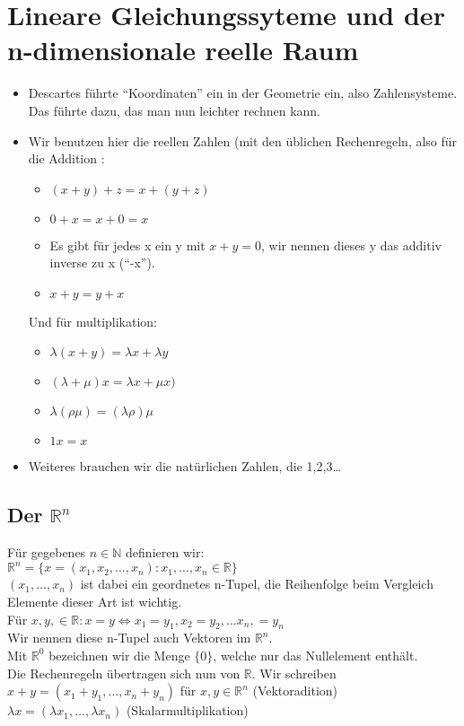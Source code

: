 \documentclass{scrartcl}
\newcommand{\lb}{\lambda}
\newcommand{\R}{\mathbb{R}}
\newcommand{\N}{\mathbb{N}}
\newcommand{\mR}{\(\mathbb{R}\)}
\newcommand{\Rn}{\mathbb{R}^n}
\newcommand{\mRn}{\(\mathbb{R}^n\)}
\begin{document}
\section{Lineare Gleichungssyteme und der n-dimensionale reelle Raum}
\begin{itemize}
\item{Descartes f\"uhrte ``Koordinaten'' ein in der Geometrie ein, also Zahlensysteme. Das f\"uhrte dazu, das man nun leichter rechnen kann.}
\item{Wir benutzen hier die reellen Zahlen (mit den \"ublichen Rechenregeln, also f\"ur die Addition :
\begin{itemize}
\item{\((x + y) + z = x + (y + z)\)}\\
\item{\(0 + x = x + 0 = x\)}
\item{Es gibt f\"ur jedes x ein y mit \(x + y = 0\), wir nennen dieses y das additiv inverse zu x (``-x'').}
\item{\(x + y = y + x\)}
\end{itemize}
Und f\"ur multiplikation:
\begin{itemize}
\item{\(\lambda (x + y) = \lambda x + \lambda y\)}
\item{\((\lambda + \mu) x = \lambda x + \mu x)\)}
\item{\(\lb(\rho\mu)=(\lb\rho)\mu\)}
\item{\(1x = x\)}
\end{itemize}
}
\item{Weiteres brauchen wir die nat\"urlichen Zahlen, die 1,2,3\dots}
\end{itemize}

\subsection{Der \(\R^n\)}
F\"ur gegebenes \(n \in \N\) definieren wir:\\
\(\R^n = \{x = (x_1, x_2, \dots, x_n): x_1, \dots, x_n \in \R\}\)\\
\((x_1, \dots, x_n)\) ist dabei ein geordnetes n-Tupel, die Reihenfolge beim Vergleich Elemente dieser Art ist wichtig.\\
F\"ur \(x, y, \in \R : x = y \Leftrightarrow x_1 = y_1, x_2 = y_2, \dots x_n, = y_n\)\\
Wir nennen diese n-Tupel auch Vektoren im \mRn.\\
Mit \(\R^0\) bezeichnen wir die Menge \(\{0\}\), welche nur das Nullelement enth\"alt.\\
Die Rechenregeln \"ubertragen sich nun von \mR. Wir schreiben\\
\(x + y = (x_1 + y_1, \dots, x_n + y_n)\) f\"ur \(x, y \in \Rn\) (Vektoradition)\\
\(\lb x = (\lb x_1, \dots, \lb x_n)\) (Skalarmultiplikation)
\end{document}
